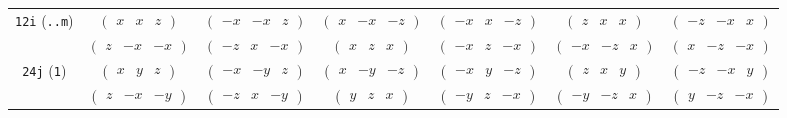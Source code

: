 \documentclass[fleqn,9pt,landscape]{jsarticle}
\begin{document}
\begin{center}
\begin{longtable}{ccccccc}
{\tt 12i} ({\tt ..m}) & $ \begin{pmatrix} x & x & z \end{pmatrix} $ & $ \begin{pmatrix} - x & - x & z \end{pmatrix} $ & $ \begin{pmatrix} x & - x & - z \end{pmatrix} $ & $ \begin{pmatrix} - x & x & - z \end{pmatrix} $ & $ \begin{pmatrix} z & x & x \end{pmatrix} $ & $ \begin{pmatrix} - z & - x & x \end{pmatrix} $ \\
& $ \begin{pmatrix} z & - x & - x \end{pmatrix} $ & $ \begin{pmatrix} - z & x & - x \end{pmatrix} $ & $ \begin{pmatrix} x & z & x \end{pmatrix} $ & $ \begin{pmatrix} - x & z & - x \end{pmatrix} $ & $ \begin{pmatrix} - x & - z & x \end{pmatrix} $ & $ \begin{pmatrix} x & - z & - x \end{pmatrix} $ \\ \hline
{\tt 24j} ({\tt 1}) & $ \begin{pmatrix} x & y & z \end{pmatrix} $ & $ \begin{pmatrix} - x & - y & z \end{pmatrix} $ & $ \begin{pmatrix} x & - y & - z \end{pmatrix} $ & $ \begin{pmatrix} - x & y & - z \end{pmatrix} $ & $ \begin{pmatrix} z & x & y \end{pmatrix} $ & $ \begin{pmatrix} - z & - x & y \end{pmatrix} $ \\
& $ \begin{pmatrix} z & - x & - y \end{pmatrix} $ & $ \begin{pmatrix} - z & x & - y \end{pmatrix} $ & $ \begin{pmatrix} y & z & x \end{pmatrix} $ & $ \begin{pmatrix} - y & z & - x \end{pmatrix} $ & $ \begin{pmatrix} - y & - z & x \end{pmatrix} $ & $ \begin{pmatrix} y & - z & - x \end{pmatrix} $ \\

\end{longtable}
\end{center}
\end{document}

